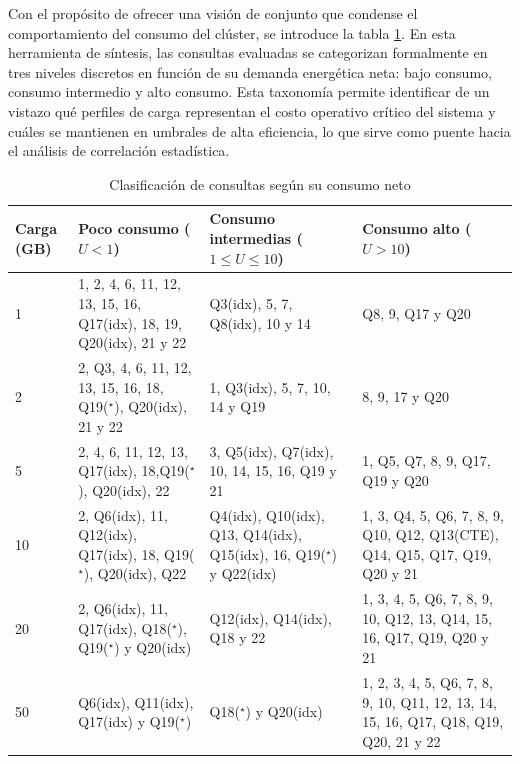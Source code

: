 \documentclass[12pt, letter paper]{report}
\begin{document}
        Con el propósito de ofrecer una visión de conjunto que condense el
        comportamiento del consumo del clúster, se introduce la tabla
        \ref{tab:consultasPorConsumo}. En esta herramienta de síntesis, las
        consultas evaluadas se categorizan formalmente en tres niveles discretos
        en función de su demanda energética neta: bajo consumo, consumo
        intermedio y alto consumo. Esta taxonomía permite identificar de un
        vistazo qué perfiles de carga representan el costo operativo crítico del
        sistema y cuáles se mantienen en umbrales de alta eficiencia, lo que
        sirve como puente hacia el análisis de correlación estadística.

        \begin{table}[H]
          \caption{Clasificación de consultas según su consumo neto}
          \begin{tabular}{| l | p{4.5cm} | p{4.5cm} | p{4.5cm} |}
            \hline Carga (GB) %
              &                          Poco consumo ($U < 1$)                       &                    Consumo intermedias ($1 \le U \le 10$)                &                               Consumo alto ($U > 10$)                                \\ \hline
            1 &  1, 2, 4, 6, 11, 12, 13, 15, 16, Q17(idx), 18, 19, Q20(idx), 21 y 22  &                        Q3(idx), 5, 7, Q8(idx), 10 y 14                   &                                   Q8, 9, Q17 y Q20                                   \\ \hline
            2 & 2, Q3, 4, 6, 11, 12, 13, 15, 16, 18, Q19($^\star$), Q20(idx), 21 y 22 &                        1, Q3(idx), 5, 7, 10, 14 y Q19                    &                                    8, 9, 17 y Q20                                    \\ \hline
            5 &     2, 4, 6, 11, 12, 13, Q17(idx), 18,Q19($^\star$), Q20(idx), 22     &               3, Q5(idx), Q7(idx), 10, 14, 15, 16, Q19 y 21              &                            1, Q5, Q7, 8, 9, Q17, Q19 y Q20                           \\ \hline
           10 & 2, Q6(idx), 11, Q12(idx), Q17(idx), 18, Q19($^\star$), Q20(idx), Q22  & Q4(idx), Q10(idx), Q13, Q14(idx), Q15(idx), 16, Q19($^\star$) y Q22(idx) &       1, 3, Q4, 5, Q6, 7, 8, 9, Q10, Q12, Q13(CTE), Q14, Q15, Q17, Q19, Q20 y 21     \\ \hline
           20 &   2, Q6(idx), 11, Q17(idx), Q18($^\star$), Q19($^\star$) y Q20(idx)   &                        Q12(idx), Q14(idx), Q18 y 22                      &         1, 3, 4, 5, Q6, 7, 8, 9, 10, Q12, 13, Q14, 15, 16, Q17, Q19, Q20 y 21        \\ \hline
           50 &              Q6(idx), Q11(idx), Q17(idx) y Q19($^\star$)              &                          Q18($^\star$) y Q20(idx)                        & 1, 2, 3, 4, 5, Q6, 7, 8, 9, 10, Q11, 12, 13, 14, 15, 16, Q17, Q18, Q19, Q20, 21 y 22 \\ \hline
          \end{tabular}
          \label{tab:consultasPorConsumo}
        \end{table}
\end{document}
